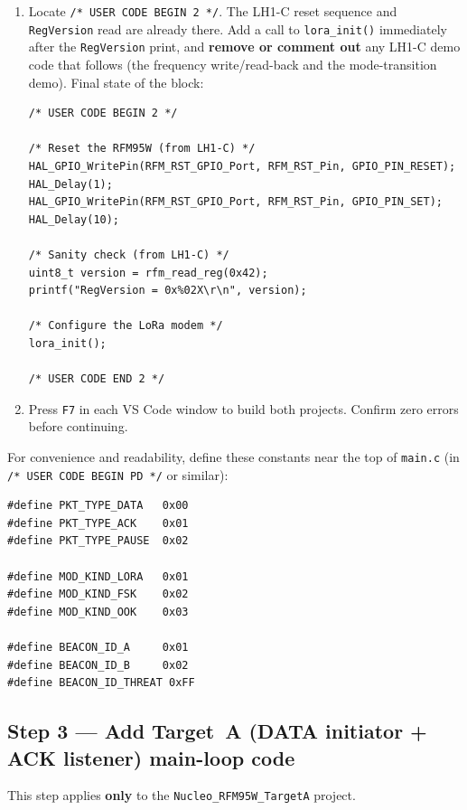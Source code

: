 \documentclass[11pt,letterpaper]{article}
\begin{document}
\begin{enumerate}[leftmargin=2em]
	\item Locate \texttt{/* USER CODE BEGIN 2 */}. The LH1-C reset sequence and \texttt{RegVersion} read are already there. Add a call to \texttt{lora\_init()} immediately after the \texttt{RegVersion} print, and \textbf{remove or comment out} any LH1-C demo code that follows (the frequency write/read-back and the mode-transition demo). Final state of the block:
\begin{verbatim}
/* USER CODE BEGIN 2 */

/* Reset the RFM95W (from LH1-C) */
HAL_GPIO_WritePin(RFM_RST_GPIO_Port, RFM_RST_Pin, GPIO_PIN_RESET);
HAL_Delay(1);
HAL_GPIO_WritePin(RFM_RST_GPIO_Port, RFM_RST_Pin, GPIO_PIN_SET);
HAL_Delay(10);

/* Sanity check (from LH1-C) */
uint8_t version = rfm_read_reg(0x42);
printf("RegVersion = 0x%02X\r\n", version);

/* Configure the LoRa modem */
lora_init();

/* USER CODE END 2 */
\end{verbatim}

	\item Press \texttt{F7} in each VS Code window to build both projects. Confirm zero errors before continuing.
\end{enumerate}

\begin{tcolorbox}[infobox={Packet-type and modulation-kind constants}]
	For convenience and readability, define these constants near the top of \texttt{main.c} (in \texttt{/* USER CODE BEGIN PD */} or similar):
\begin{verbatim}
#define PKT_TYPE_DATA   0x00
#define PKT_TYPE_ACK    0x01
#define PKT_TYPE_PAUSE  0x02

#define MOD_KIND_LORA   0x01
#define MOD_KIND_FSK    0x02
#define MOD_KIND_OOK    0x03

#define BEACON_ID_A     0x01
#define BEACON_ID_B     0x02
#define BEACON_ID_THREAT 0xFF
\end{verbatim}
\end{tcolorbox}

\newpage
\subsection{Step 3 --- Add Target~A (DATA initiator + ACK listener) main-loop code}

This step applies \textbf{only} to the \texttt{Nucleo\_RFM95W\_TargetA} project.
\end{document}
